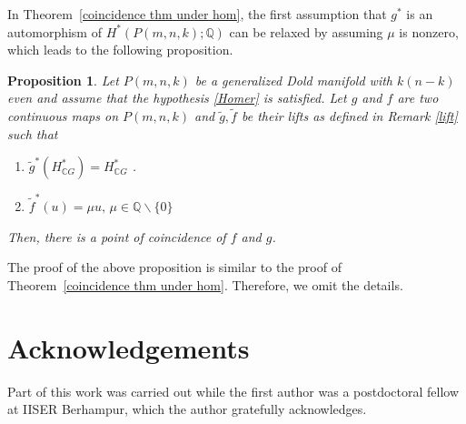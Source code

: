 \documentclass{amsart}
\newtheorem{proposition}[theorem]{Proposition}
\newcommand{\thmref}[1]{Theorem~\ref{#1}}
\begin{document}
In \thmref{coincidence thm under hom}, the first assumption that $g^*$ is an automorphism %
of $H^*(P(m,n,k); \mathbb{Q})$ can %
be relaxed by assuming $\mu$ is nonzero, which leads %
to the following proposition. 
\begin{proposition}
	Let %
$P(m,n,k)$ be a generalized Dold manifold with $k(n-k)$ even and assume that the hypothesis \eqref{Homer} is satisfied. Let $g$ and $f$ are two continuous maps on $P(m,n,k)$ and $\tilde g, \tilde f$ be their lifts as defined in  Remark \ref{lift} such %
that
	\begin{enumerate}
		\item $\tilde g^*(H^*_{\mathbb CG})= H^*_{\mathbb CG}$%
.
		\item $\tilde f^*(u)=\mu u,\, \mu\in \mathbb Q\backslash \{0\}$
	\end{enumerate}
Then, there is a point of coincidence of $f$ and  $g$.
\end{proposition}
The proof of the %
above proposition is %
similar to the proof of \thmref{coincidence thm under hom}. Therefore, we omit the %
details.

\section*{Acknowledgements}
Part %
of this work was carried out while the first author was a postdoctoral fellow at IISER Berhampur, which the author gratefully acknowledges.
\end{document}

